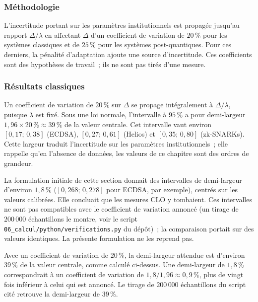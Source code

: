 \begin{sloppypar}

\subsubsection{M\'ethodologie}
\label{subsec:methodologie_bootstrap}

L'incertitude portant sur les param\`etres institutionnels est propag\'ee
jusqu'au rapport $\Delta/\lambda$ en affectant $\Delta$ d'un coefficient de
variation de $20\,\%$ pour les syst\`emes classiques et de $25\,\%$ pour les
syst\`emes post-quantiques. Pour ces derniers, la p\'enalit\'e d'adaptation ajoute une source
d'incertitude. Ces coefficients sont des hypoth\`eses de travail~; ils ne sont
pas tir\'es d'une mesure.

\subsubsection{R\'esultats classiques}
\label{subsec:resultats_classiques_bootstrap}

Un coefficient de variation de $20\,\%$ sur $\Delta$ se propage int\'egralement
\`a $\Delta/\lambda$, puisque $\lambda$ est fix\'e. Sous une loi normale,
l'intervalle \`a $95\,\%$ a pour demi-largeur $1{,}96 \times 20\,\% \approx 39\,\%$ de la
valeur centrale. Cet intervalle vaut environ $[0{,}17;\,0{,}38]$
(ECDSA), $[0{,}27;\,0{,}61]$ (Helios) et $[0{,}35;\,0{,}80]$ (zk-SNARKs). Cette
largeur traduit l'incertitude sur les param\`etres institutionnels~; elle
rappelle qu'en l'absence de donn\'ees, les valeurs de ce chapitre sont des
ordres de grandeur.

\begin{remark}
\label{rem:ic_anterieurs}
La formulation initiale de cette section donnait des intervalles de demi-largeur
d'environ $1{,}8\,\%$ ($[0{,}268;\,0{,}278]$ pour ECDSA, par exemple), centr\'es sur
les valeurs calibr\'ees. Elle concluait que les \og mesures CLO\fg{} y tombaient.
Ces intervalles ne sont pas compatibles avec le coefficient de variation annonc\'e
(un tirage de $200\,000$ \'echantillons le montre, voir le script
\texttt{06\_calcul/python/verifications.py} du d\'ep\^ot)~; la comparaison portait
sur des valeurs identiques. La pr\'esente formulation ne les reprend pas.
\end{remark}

\begin{Preuve}
Avec un coefficient de variation de $20\,\%$, la demi-largeur attendue est
d'environ $39\,\%$ de la valeur centrale, comme calcul\'e ci-dessus. Une demi-largeur
de $1{,}8\,\%$ correspondrait \`a un coefficient de variation de
$1{,}8/1{,}96 \approx 0{,}9\,\%$, plus de vingt fois inf\'erieur \`a celui qui est annonc\'e.
Le tirage de $200\,000$ \'echantillons du script cit\'e retrouve la demi-largeur de
$39\,\%$.
\end{Preuve}


\end{sloppypar}
